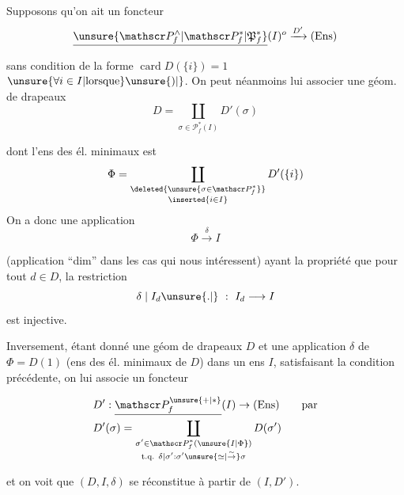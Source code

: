 
 Supposons qu'on ait un foncteur
\[
 \underline{\unsure{\mathscr P_f^\wedge|\mathscr P_f^*|\mathfrak P_f^*}}(I)^o\xrightarrow{D'}(\mathrm{Ens})
\]

sans condition de la forme $\operatorname{card}D(\{i\})=1$ $\unsure{\forall i\in I|\text{lorsque}}\unsure{)|{}}$. On peut néanmoins lui associer une géom. de drapeaux 
\[
 D=\coprod_{\sigma\in\mathscr P_f^*(I)}D'(\sigma)
\]

dont l'ens des él. minimaux est
\[
 \Phi=\coprod_{\substack{\deleted{\unsure{\sigma\in\mathscr P_f^*}}\\\inserted{i\in I}}}D'(\{i\})
\]
On a donc une application
\[
 \Phi\xrightarrow{\delta}I
\]

(application ``dim'' \deleted{\unsure{$\delta$}} dans les cas qui nous intéressent) ayant la propriété que pour tout $d\in D$, la restriction 
\[
 \delta\mid I_d\unsure{.|{}}\ :\ I_d\longrightarrow I
\]
est injective.

Inversement, étant donné une géom de drapeaux $D$ et une application $\delta$ de $\Phi=D(1)$ (ens des él. minimaux de $D$) dans un ens $I$, satisfaisant la condition précédente, on lui associe un foncteur

\[
\begin{aligned}
 &D':\underline{\mathscr P_f^{\unsure{+|*}}}(I)\to(\mathrm{Ens})\qquad\text{par}\\
 &D'(\sigma)=\coprod_{\substack{\sigma'\in\mathscr P_f^*(\unsure{I|\Phi})\\\text{t.q. }\delta|\sigma':\sigma'\unsure{\simeq|\overset{\sim}{\to}}\sigma}}D(\sigma')
\end{aligned}
\]

et on voit que $(D,I,\delta)$ se réconstitue à partir de $(I,D')$. 

